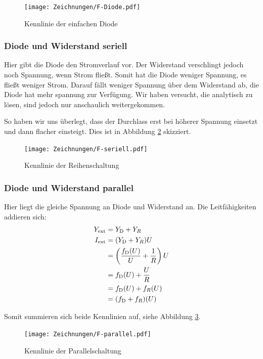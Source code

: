 \begin{figure}[h]
	\centering
	\caption{%
		Kennlinie der einfachen Diode
	}
	\label{fig:F-Diode}
	\texttt{[image: Zeichnungen/F-Diode.pdf]}
\end{figure}

\subsubsection{Diode und Widerstand seriell}

Hier gibt die Diode den Stromverlauf vor. Der Widerstand verschlingt jedoch
noch Spannung, wenn Strom fließt. Somit hat die Diode weniger Spannung, es
fließt weniger Strom. Darauf fällt weniger Spannung über dem Widerstand ab, die
Diode hat mehr spannung zur Verfügung. Wir haben versucht, die analytisch zu
lösen, sind jedoch nur anschaulich weitergekommen.

So haben wir uns überlegt, dass der Durchlass erst bei höherer Spannung
einsetzt und dann flacher einsteigt. Dies ist in Abbildung \ref{fig:F-seriell}
skizziert.

\begin{figure}[h]
	\centering
	\caption{%
		Kennlinie der Reihenschaltung
	}
	\label{fig:F-seriell}
	\texttt{[image: Zeichnungen/F-seriell.pdf]}
\end{figure}

\subsubsection{Diode und Widerstand parallel}

Hier liegt die gleiche Spannung an Diode und Widerstand an. Die Leitfähigkeiten
addieren sich:
\begin{align*}
	Y_\text{ext} &= Y_\text D + Y_R \\
	I_\text{ext} &= (Y_\text D + Y_R) U \\
	&= \del{\frac{f_\text D(U)}U + \frac 1R} U \\
	&= f_\text D (U) + \frac UR \\
	&= f_\text D (U) + f_R(U) \\
	&= (f_\text D + f_R)(U)
\end{align*}

Somit summieren sich beide Kennlinien auf, siehe Abbildung
\ref{fig:F-parallel}.

\begin{figure}[h]
	\centering
	\caption{%
		Kennlinie der Parallelschaltung
	}
	\label{fig:F-parallel}
	\texttt{[image: Zeichnungen/F-parallel.pdf]}
\end{figure}

